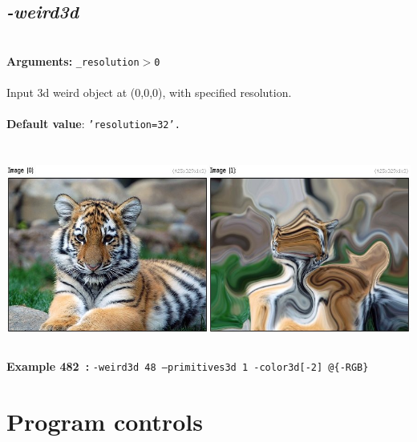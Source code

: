 \documentclass[a4paper,11pt,twoside]{book}
\begin{document}
\subsection{\emph{-weird3d} }\vspace*{-0.5em}
~\\\textbf{Arguments: } 
{\small \texttt{\_resolution$>$0}}\\~\\
Input 3d weird object at (0,0,0), with specified resolution.
~\\~\\\textbf{Default value}: {\small \texttt{'resolution=32'.}}
\begin{center}\includegraphics[keepaspectratio=true,height=7cm,width=\textwidth]{img/gmic_def482.jpg}\\
{\footnotesize \textbf{Example 482~:} \texttt{-weird3d 48 --primitives3d 1 -color3d[-2] @\{-RGB\}}}
\end{center}
\section{Program controls}
\end{document}
